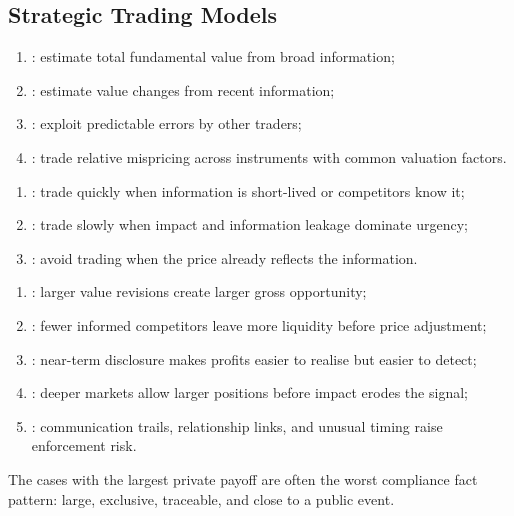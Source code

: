 \subsection{Strategic Trading Models}

\begin{taxonomy} 
\begin{enumerate}[label=\roman*.]
\setlength{\itemsep}{0pt}
\item {}: estimate total fundamental value from broad information;
\item {}: estimate value changes from recent information;
\item {}: exploit predictable errors by other traders;
\item {}: trade relative mispricing across instruments with common valuation factors.
\end{enumerate}
\end{taxonomy}

\begin{taxonomy} 
\begin{enumerate}[label=\roman*.]
\setlength{\itemsep}{0pt}
\item {}: trade quickly when information is short-lived or competitors know it;
\item {}: trade slowly when impact and information leakage dominate urgency;
\item {}: avoid trading when the price already reflects the information.
\end{enumerate}
\end{taxonomy}

\begin{taxonomy} 
\begin{enumerate}[label=\roman*.]
\setlength{\itemsep}{0pt}
\item {}: larger value revisions create larger gross opportunity;
\item {}: fewer informed competitors leave more liquidity before price adjustment;
\item {}: near-term disclosure makes profits easier to realise but easier to detect;
\item {}: deeper markets allow larger positions before impact erodes the signal;
\item {}: communication trails, relationship links, and unusual timing raise enforcement risk.
\end{enumerate}
The cases with the largest private payoff are often the worst compliance fact pattern: large, exclusive, traceable, and close to a public event.
\end{taxonomy}

